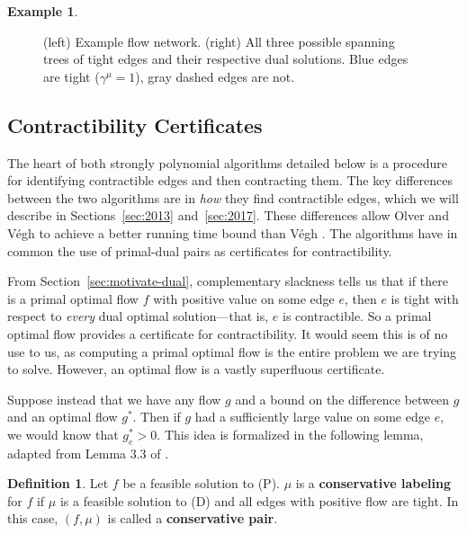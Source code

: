\documentclass[11pt]{article}
\theoremstyle{definition}
\newtheorem{definition}{Definition}[section]
\theoremstyle{definition}
\theoremstyle{definition}
\newtheorem{example}{Example}[section]
\begin{document}
\begin{example}
\begin{figure}[h]
\begin{minipage}{.49\textwidth}
	\end{minipage}
	\label{fig:ex-spanning}
	\caption{(left) Example flow network. (right) All three possible 
	spanning trees of tight edges and their respective dual solutions.
	Blue edges are tight ($\gamma^{\mu} = 1$), gray dashed edges are not.}
	\end{figure}
	\end{example}
	
	
	\subsection{Contractibility Certificates} \label{sec:cert-contract}
	The heart of both strongly polynomial algorithms detailed below is a procedure for
	identifying contractible edges and then contracting them.
	The key differences between the two algorithms are in 
	\textit{how} they find contractible edges, which
	we will describe in Sections~\ref{sec:2013} and~\ref{sec:2017}. These differences
	allow Olver and Végh \cite{Olver2017} to achieve a better running time bound than
	Végh \cite{Vegh2013}. The algorithms have in common the use of primal-dual pairs
	as certificates for contractibility.

	From Section~\ref{sec:motivate-dual}, complementary slackness tells us that if there is a primal optimal flow
	$f$ with positive value
	on some edge $e$, then $e$ is tight with respect to \emph{every} dual
	optimal solution---that
	is, $e$ is contractible. So a primal optimal flow provides a certificate
	for contractibility.
	It would seem this is of no use to us, as computing a primal optimal flow is the entire
	problem we are trying to solve. However,
	an optimal flow is a vastly superfluous certificate.
	
	Suppose instead that we have any flow $g$ and a bound on the difference
	between $g$ and an optimal
	flow $g^*$. Then if $g$ had a sufficiently large value on some edge $e$, we would know that
	$g^*_e > 0$. This idea is formalized in the following lemma, adapted from Lemma 3.3 of
	\cite{Olver2017}.
	
  	\begin{definition} \label{def:conservative}
  	Let $f$ be a feasible solution to (P).
	$\mu$ is a \textbf{conservative labeling} for $f$ if $\mu$ is
	a feasible solution to (D) and all edges with positive flow are tight. In this case,
	$(f, \mu)$ is called a \textbf{conservative pair}.
	\end{definition}
\end{document}
